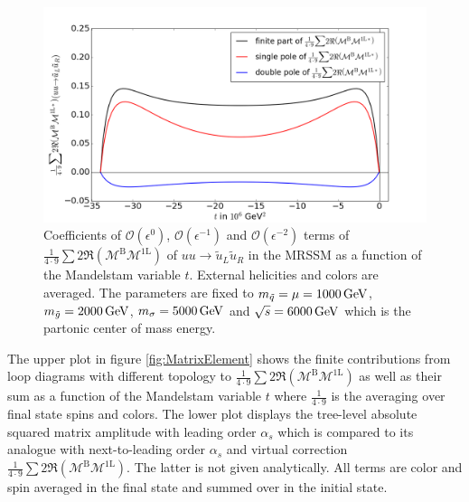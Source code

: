 \begin{figure}[H]
\begin{center}
\includegraphics[scale=.5]{figures/MatrixElement_Poles.png}
\caption{Coefficients of $\mathcal{O}(\epsilon^0)$, $\mathcal{O}(\epsilon^{-1})$ and $\mathcal{O}(\epsilon^{-2})$ terms of $\frac{1}{4\cdot 9}\sum 2 \Re (\mathcal{M}^{\mathrm{B}}\mathcal{M}^{\mathrm{1L}})$ of $uu \to \tilde{u}_L\tilde{u}_R$ in the MRSSM as a function of the Mandelstam variable $t$. External helicities and colors are averaged. The parameters are fixed to $m_{\tilde{q}} = \mu = \unit[1000]{GeV}$, $m_{\tilde{g}} = \unit[2000]{GeV}$, $m_{\sigma} = \unit[5000]{GeV}$ and $\sqrt{s} = \unit[6000]{GeV}$ which is the partonic center of mass energy.}\label{fig:MatrixElementPoles}
\end{center}
\end{figure}
The upper plot in figure \ref{fig:MatrixElement} shows the finite contributions from loop diagrams with different topology to $\frac{1}{4\cdot 9}\sum 2 \Re (\mathcal{M}^{\mathrm{B}}\mathcal{M}^{\mathrm{1L}})$ as well as their sum as a function of the Mandelstam variable $t$ where $\frac{1}{4\cdot 9}$ is the averaging over final state spins and colors. The lower plot displays the tree-level absolute squared matrix amplitude with leading order $\alpha_s$ which is compared to its analogue with next-to-leading order $\alpha_s$ and virtual correction $\frac{1}{4\cdot 9}\sum 2 \Re (\mathcal{M}^{\mathrm{B}}\mathcal{M}^{\mathrm{1L}})$. The latter is not given analytically. All terms are color and spin averaged in the final state and summed over in the initial state.
